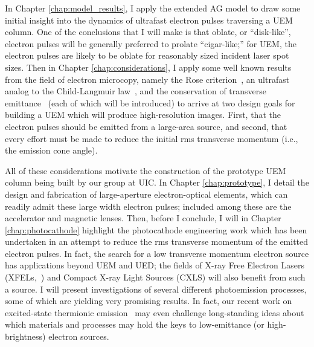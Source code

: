 In Chapter \ref{chap:model_results}, I apply the extended AG model to draw some initial insight into the dynamics of ultrafast electron pulses traversing a UEM column.
One of the conclusions that I will make is that oblate, or ``disk-like'', electron pulses will be generally preferred to prolate ``cigar-like;'' for UEM, the electron pulses are likely to be oblate for reasonably sized incident laser spot sizes.
Then in Chapter \ref{chap:considerations}, I apply some well known results from the field of electron microcopy, namely the Rose criterion~\cite{rose_television_1948}, an ultrafast analog to the Child-Langmuir law~\cite{child_discharge_1911,langmuir_effect_1923,valfells_effects_2002}, and the conservation of transverse emittance~\cite{jensen_emittance_2010} (each of which will be introduced) to arrive at two design goals for building a UEM which will produce high-resolution images.
First, that the electron pulses should be emitted from a large-area source, and second, that every effort must be made to reduce the initial rms transverse momentum (i.e., the emission cone angle).

All of these considerations motivate the construction of the prototype UEM column being built by our group at UIC.
In Chapter \ref{chap:prototype}, I detail the design and fabrication of large-aperture electron-optical elements, which can readily admit these large width electron pulses; included among these are the accelerator and magnetic lenses.
Then, before I conclude, I will in Chapter \ref{chap:photocathode} highlight the photocathode engineering work which has been undertaken in an attempt to reduce the rms transverse momentum of the emitted electron pulses.
In fact, the search for a low transverse momentum electron source has applications beyond UEM and UED; the fields of X-ray Free Electron Lasers (XFELs,~\cite{nemeth_high_2010}) and Compact X-ray Light Sources (CXLS) \cite{cxls_workshop_report_2012} will also benefit from such a source.
I will present investigations of several different photoemission processes, some of which are yielding very promising results.
In fact, our recent work on excited-state thermionic emission~\cite{berger_excited_2012} may even challenge long-standing ideas about which materials and processes may hold the keys to low-emittance (or high-brightness) electron sources.


